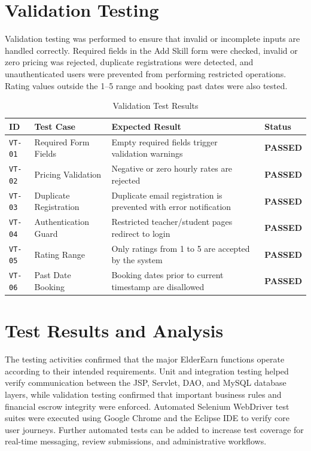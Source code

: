 \section{Validation Testing}
Validation testing was performed to ensure that invalid or incomplete inputs are handled correctly. Required fields in the Add Skill form were checked, invalid or zero pricing was rejected, duplicate registrations were detected, and unauthenticated users were prevented from performing restricted operations. Rating values outside the 1--5 range and booking past dates were also tested.

\begin{table}[H]
\centering
\small
\caption{Validation Test Results}
\label{tab:validation_test_results}
\begin{tabularx}{\textwidth}{|L{1.8cm}|L{4.2cm}|J|C{2.0cm}|}
\hline
\textbf{ID} & \textbf{Test Case} & \textbf{Expected Result} & \textbf{Status} \\ \hline
\texttt{VT-01} & Required Form Fields & Empty required fields trigger validation warnings & \textbf{PASSED} \\ \hline
\texttt{VT-02} & Pricing Validation & Negative or zero hourly rates are rejected & \textbf{PASSED} \\ \hline
\texttt{VT-03} & Duplicate Registration & Duplicate email registration is prevented with error notification & \textbf{PASSED} \\ \hline
\texttt{VT-04} & Authentication Guard & Restricted teacher/student pages redirect to login & \textbf{PASSED} \\ \hline
\texttt{VT-05} & Rating Range & Only ratings from 1 to 5 are accepted by the system & \textbf{PASSED} \\ \hline
\texttt{VT-06} & Past Date Booking & Booking dates prior to current timestamp are disallowed & \textbf{PASSED} \\ \hline
\end{tabularx}
\end{table}

\section{Test Results and Analysis}
The testing activities confirmed that the major ElderEarn functions operate according to their intended requirements. Unit and integration testing helped verify communication between the JSP, Servlet, DAO, and MySQL database layers, while validation testing confirmed that important business rules and financial escrow integrity were enforced. Automated Selenium WebDriver test suites were executed using Google Chrome and the Eclipse IDE to verify core user journeys. Further automated tests can be added to increase test coverage for real-time messaging, review submissions, and administrative workflows.

